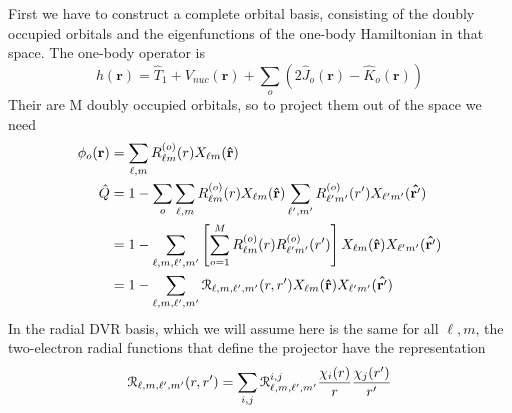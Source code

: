 \documentclass[%
pra%
,twocolumn%
,amssymb, nobibnotes, aps,
longbibliography
]{revtex4-1}
\begin{document}
First we have to construct a complete orbital basis, consisting of the doubly occupied orbitals and the eigenfunctions of the one-body Hamiltonian in that space.
The one-body operator is
\begin{equation}
h(\mathbf{r})= \hat{T}_1 + V_{nuc}(\mathbf{r})  + \sum_o \left( 2 \hat{J}_o(\mathbf{r}) - \hat{K}_o(\mathbf{r})  \right) 
\end{equation}
Their are M doubly occupied orbitals, so to project them out of the space we need
\begin{equation}
\begin{split}
\phi_o(\mathbf{r}) &= \sum_{\ell,m} R^{(o)}_{\ell m}(r) X_{\ell m} (  \mathbf{\hat{r}} )\\
\hat{Q}&= 1 - \sum_o \sum_{\ell,m} R^{(o)}_{\ell m}(r) X_{\ell m} (  \mathbf{\hat{r}} ) \sum_{\ell',m'} R^{(o)}_{\ell' m'}(r') X_{\ell' m'} (  \mathbf{\hat{r'}} ) \\
&= 1- \sum_{\ell,m,\ell',m'} \left[\sum_{o=1}^M  R^{(o)}_{\ell m}(r) R^{(o)}_{\ell' m'}(r') \right] X_{\ell m} (  \mathbf{\hat{r}} ) X_{\ell' m'} (  \mathbf{\hat{r'}} ) \\
&= 1- \sum_{\ell,m,\ell',m'}  \EuScript{R}_{\ell,m,\ell',m'} (r,r') X_{\ell m} (  \mathbf{\hat{r}} ) X_{\ell' m'} (  \mathbf{\hat{r'}} )
\end{split}
\label{eq:Qonebody}
\end{equation}
In the radial DVR basis, which we will assume here is the same for all $\ell, m$, the two-electron radial functions that define the projector have the representation
\begin{equation}
\begin{split}
 \EuScript{R}_{\ell,m,\ell',m'} (r,r') = \sum_{i,j}  \EuScript{R}_{\ell,m,\ell',m'}^{i,j} \frac{\chi_i(r)}{r} \frac{ \chi_j(r') }{r'}
\end{split}
\end{equation}
\end{document}
